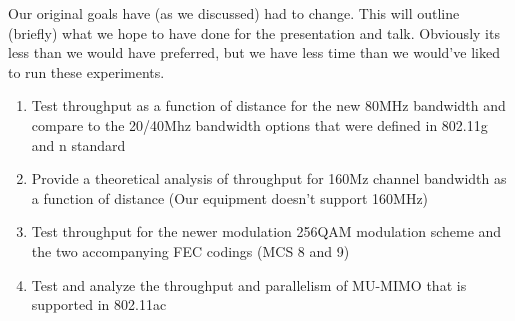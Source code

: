 

Our original goals have (as we discussed) had to change. This will outline (briefly) what we hope to have done for the presentation and talk.
Obviously its less than we would have preferred, but we have less time than we would've liked to run these experiments.

\begin{enumerate}
\item Test throughput as a function of distance for the new 80MHz bandwidth and compare to the 20/40Mhz bandwidth options that were defined in 802.11g and n standard
\item Provide a theoretical analysis of throughput for 160Mz channel bandwidth as a function of distance (Our equipment doesn't support 160MHz)
\item Test throughput for the newer modulation 256QAM modulation scheme and the two accompanying FEC codings (MCS 8 and 9)
\item Test and analyze the throughput and parallelism of MU-MIMO that is supported in 802.11ac
\end{enumerate}
